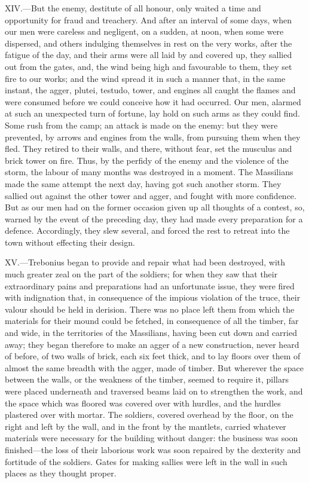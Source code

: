 XIV.—But the enemy, destitute of all honour, only waited a time and
opportunity for fraud and treachery. And after an interval of some days,
when our men were careless and negligent, on a sudden, at noon, when
some were dispersed, and others indulging themselves in rest on the very
works, after the fatigue of the day, and their arms were all laid by and
covered up, they sallied out from the gates, and, the wind being high
and favourable to them, they set fire to our works; and the wind spread
it in such a manner that, in the same instant, the agger, plutei,
testudo, tower, and engines all caught the flames and were consumed
before we could conceive how it had occurred. Our men, alarmed at such
an unexpected turn of fortune, lay hold on such arms as they could find.
Some rush from the camp; an attack is made on the enemy: but they were
prevented, by arrows and engines from the walls, from pursuing them when
they fled. They retired to their walls, and there, without fear, set the
musculus and brick tower on fire. Thus, by the perfidy of the enemy and
the violence of the storm, the labour of many months was destroyed in a
moment. The Massilians made the same attempt the next day, having got
such another storm. They sallied out against the other tower and agger,
and fought with more confidence. But as our men had on the former
occasion given up all thoughts of a contest, so, warned by the event of
the preceding day, they had made every preparation for a defence.
Accordingly, they slew several, and forced the rest to retreat into the
town without effecting their design.

XV.—Trebonius began to provide and repair what had been destroyed, with
much greater zeal on the part of the soldiers; for when they saw that
their extraordinary pains and preparations had an unfortunate issue,
they were fired with indignation that, in consequence of the impious
violation of the truce, their valour should be held in derision. There
was no place left them from which the materials for their mound could be
fetched, in consequence of all the timber, far and wide, in the
territories of the Massilians, having been cut down and carried away;
they began therefore to make an agger of a new construction, never heard
of before, of two walls of brick, each six feet thick, and to lay floors
over them of almost the same breadth with the agger, made of timber. But
wherever the space between the walls, or the weakness of the timber,
seemed to require it, pillars were placed underneath and traversed beams
laid on to strengthen the work, and the space which was floored was
covered over with hurdles, and the hurdles plastered over with mortar.
The soldiers, covered overhead by the floor, on the right and left by
the wall, and in the front by the mantlets, carried whatever materials
were necessary for the building without danger: the business was soon
finished—the loss of their laborious work was soon repaired by the
dexterity and fortitude of the soldiers. Gates for making sallies were
left in the wall in such places as they thought proper.

